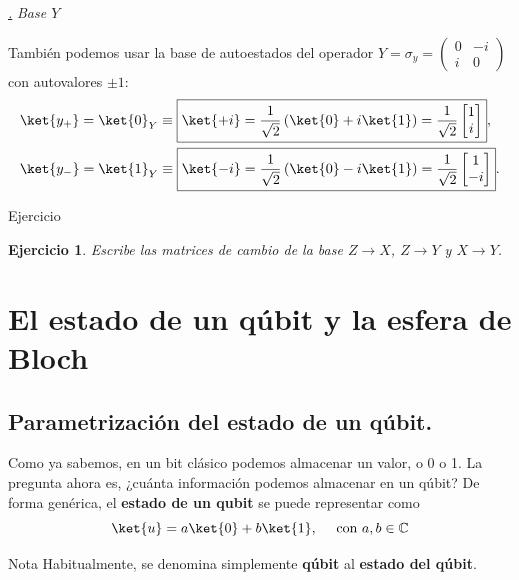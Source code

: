 \documentclass[a4paper,11pt]{book} %
\newtheorem{ejercicio_contador}{Ejercicio}
\newcommand{\Ejercicio}[1]{
		\begin{mybox_gray}{Ejercicio} 
			\begin{ejercicio_contador}
				 #1 
			\end{ejercicio_contador} 
		\end{mybox_gray}
	}
\numberwithin{equation}{chapter}
\def\lp{\left(}
\def\rp{\right)}
\def\subsubiContadorIt{\par\addtocounter{subsubsection}{1}\underline{\it\thesubsubsection.}\hskip0.5cm \setcounter{subsubsubsectionIt}{0}}
\newcommand{\SubsubiIt}[1]{
		\subsubiContadorIt \textit{#1}
	}
\newcounter{subsubsubsectionIt}[subsubsection]
\begin{document}
			\SubsubiIt{Base $Y$} 
			
También podemos usar la base de autoestados del operador $Y = \sigma_y = \lp \begin{matrix} 0 & -i \\ i & 0 \end{matrix} \rp $ con autovalores $\pm 1$:
	\begin{align}
	& \ket{y_+} = \ket{0}_Y \equiv \boxed{\ket{+i} = \frac{1}{\sqrt{2}} \lp \ket{0} + i \ket{1} \rp = \frac{1}{\sqrt{2}} \begin{bmatrix}  1 \\ i  \end{bmatrix}}, \label{ec_qubit_y-} \\
	& \ket{y_-} = \ket{1}_Y \equiv \boxed{\ket{-i} =  \frac{1}{\sqrt{2}} \lp \ket{0} - i \ket{1} \rp = \frac{1}{\sqrt{2}} \begin{bmatrix}  1 \\ -i  \end{bmatrix}}. \label{ec_qubit_y-}
	\end{align}
   	
	\Ejercicio{
	Escribe las matrices de cambio de la base $Z\to X$, $Z\to Y$ y $X\to Y$.
	}
	

    	
    \section{El estado de un qúbit y la esfera de Bloch}
    	\subsection{Parametrización del estado de un qúbit.}
    
Como ya sabemos, en un bit clásico podemos almacenar un valor, o 0 o 1. La pregunta ahora es, ¿cuánta información podemos almacenar en un qúbit? De forma genérica, el \textbf{estado de un qubit} se puede representar como
	\begin{equation}
	\ket{u} = a \ket{0} + b \ket{1}, ~~~~ \text{con } a,b \in \mathbb{C}
	\end{equation}
	
	\begin{mybox_blue}{Nota}
	Habitualmente, se denomina simplemente \textbf{qúbit} al \textbf{estado del qúbit}.
	\end{mybox_blue}	
	
\end{document}
